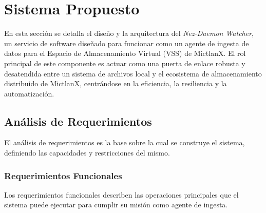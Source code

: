 \section{Sistema Propuesto}

En esta sección se detalla el diseño y la arquitectura del \textit{Nez-Daemon Watcher}, un servicio de software diseñado para funcionar como un agente de ingesta de datos para el Espacio de Almacenamiento Virtual (VSS) de MictlanX. El rol principal de este componente es actuar como una puerta de enlace robusta y desatendida entre un sistema de archivos local y el ecosistema de almacenamiento distribuido de MictlanX, centrándose en la eficiencia, la resiliencia y la automatización.

\subsection{Análisis de Requerimientos}
El análisis de requerimientos es la base sobre la cual se construye el sistema, definiendo las capacidades y restricciones del mismo.

\subsubsection{Requerimientos Funcionales}
Los requerimientos funcionales describen las operaciones principales que el sistema puede ejecutar para cumplir su misión como agente de ingesta.

